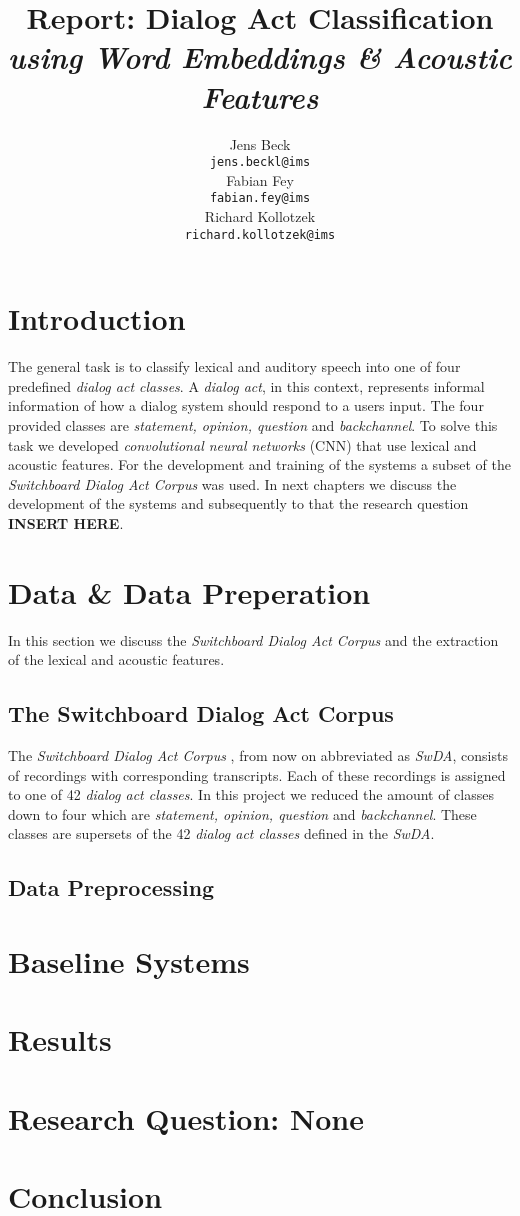 \documentclass[11pt,a4paper]{article}
\title{Report: Dialog Act Classification\\\textit{using Word Embeddings \& Acoustic Features}}
\author{Jens Beck \\
  {\tt jens.beckl@ims} \\\And
  Fabian Fey \\
  {\tt fabian.fey@ims} \\\And
  Richard Kollotzek \\
  {\tt richard.kollotzek@ims} \\}
\date{}
\begin{document}
\maketitle

\begin{abstract}

\end{abstract}

\section{Introduction}
The general task is to classify lexical and auditory speech into one of four predefined \textit{dialog act classes}. A \textit{dialog act}, in this context, represents informal information of how a dialog system should respond to a users input. The four provided classes are \textit{statement, opinion, question} and \textit{backchannel}. To solve this task we developed \textit{convolutional neural networks} (CNN) that use lexical and acoustic features. For the development and training of the systems a subset of the \textit{Switchboard Dialog Act Corpus} was used. In next chapters we discuss the development of the systems and subsequently to that the research question \textbf{INSERT HERE}.

\section{Data \& Data Preperation}
In this section we discuss the \textit{Switchboard Dialog Act Corpus} and the extraction of the lexical and acoustic features.

	\subsection{The Switchboard Dialog Act Corpus}
	The \textit{Switchboard Dialog Act Corpus} \cite{switchboard}, from now on abbreviated as \textit{SwDA}, consists of recordings with corresponding transcripts. Each of these recordings is assigned to one of 42 \textit{dialog act classes}. In this project we reduced the amount of classes down to four which are \textit{statement, opinion, question} and \textit{backchannel}. These classes are supersets of the 42 \textit{dialog act classes} defined in the \textit{SwDA}.

	\subsection{Data Preprocessing}

\section{Baseline Systems}

\section{Results}

\section{Research Question: None}

\section{Conclusion}



\end{document}
